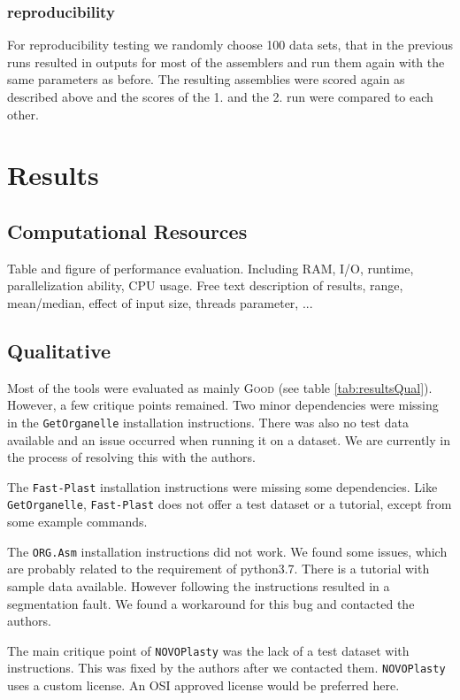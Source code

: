 \documentclass{bmcart}
\newcommand{\formatprogramnames}[1]{\texttt{#1}}
\newcommand{\oa}{\formatprogramnames{ORG.Asm}}
\newcommand{\fp}{\formatprogramnames{Fast-Plast}}
\newcommand{\np}{\formatprogramnames{NOVOPlasty}}
\newcommand{\go}{\formatprogramnames{GetOrganelle}}
\newcommand{\good}{\textsc{Good}}
\begin{document}


\subsubsection*{reproducibility}
For reproducibility testing we randomly choose 100 data sets, that in the previous runs resulted in outputs for most of the assemblers and run them again with the same parameters as before. The resulting assemblies were scored again as described above and the scores of the 1. and the 2. run were compared to each other. 

\section*{Results}
\subsection*{Computational Resources}
Table and figure of performance evaluation. Including RAM, I/O, runtime, parallelization ability, CPU usage. Free text description of results, range, mean/median, effect of input size, threads parameter, ...

\subsection*{Qualitative}
Most of the tools were evaluated as mainly \good{} (see table \ref{tab:resultsQual}). However, a few critique points remained.
Two minor dependencies were missing in the \go{} installation instructions. There was also no test data available and an issue occurred when running it on a  dataset. We are currently in the process of resolving this with the authors.

The \fp{} installation instructions were missing some dependencies. Like \go{}, \fp{} does not offer a test dataset or a tutorial, except from some example commands. 

The \oa{} installation instructions did not work. We found some issues, which are probably related to the requirement of python3.7. There is a tutorial with sample data available. However following the instructions resulted in a segmentation fault. We found a workaround for this bug and contacted the authors.

The main critique point of \np{} was the lack of a test dataset with instructions. This was fixed by the authors after we contacted them. \np{} uses a custom license. An OSI approved license would be preferred here.
\end{document}
